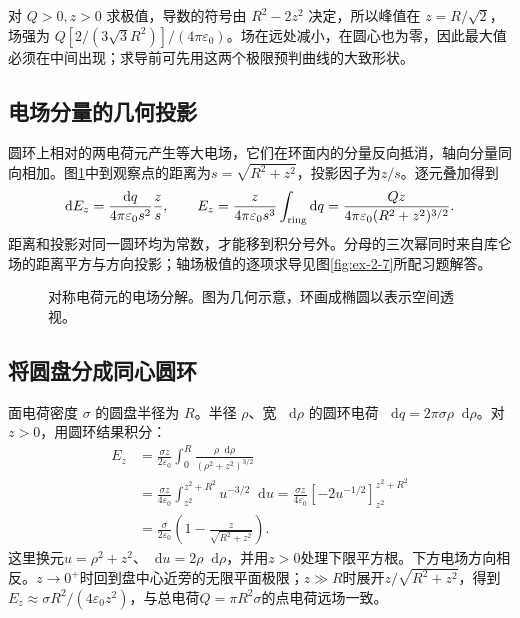\documentclass[11pt,openany,fontset=fandol]{ctexbook}
\theoremstyle{plain}\newtheorem{theorem}{定理}[chapter]\newtheorem{proposition}[theorem]{命题}
\theoremstyle{definition}\newtheorem{definition}{定义}[chapter]\newtheorem{example}{例}[chapter]
\theoremstyle{remark}\newtheorem*{remark}{说明}
\newcommand{\dd}{\mathop{}\!\mathrm d}\newcommand{\ii}{\mathrm i}\newcommand{\ee}{\mathrm e}
\begin{document}
对 $Q>0,z>0$ 求极值，导数的符号由 $R^2-2z^2$ 决定，所以峰值在 $z=R/\sqrt2$，场强为 $Q[2/(3\sqrt3R^2)]/(4\pi\varepsilon_0)$。场在远处减小，在圆心也为零，因此最大值必须在中间出现；求导前可先用这两个极限预判曲线的大致形状。

\subsection{电场分量的几何投影}
圆环上相对的两电荷元产生等大电场，它们在环面内的分量反向抵消，轴向分量同向相加。图\ref{fig:orig-033}中到观察点的距离为$s=\sqrt{R^2+z^2}$，投影因子为$z/s$。逐元叠加得到
\[
\dd E_z=\frac{\dd q}{4\pi\varepsilon_0s^2}\frac zs,
\qquad E_z=\frac{z}{4\pi\varepsilon_0s^3}\int_{\rm ring}\dd q
=\frac{Qz}{4\pi\varepsilon_0(R^2+z^2)^{3/2}}.
\]
距离和投影对同一圆环均为常数，才能移到积分号外。分母的三次幂同时来自库仑场的距离平方与方向投影；轴场极值的逐项求导见图\ref{fig:ex-2-7}所配习题解答。
\begin{figure}[H]\centering
{}
\caption{对称电荷元的电场分解。图为几何示意，环画成椭圆以表示空间透视。}
\label{fig:orig-033}
\end{figure}

\subsection{将圆盘分成同心圆环}
面电荷密度 $\sigma$ 的圆盘半径为 $R$。半径 $\rho$、宽 $\dd\rho$ 的圆环电荷 $\dd q=2\pi\sigma\rho\dd\rho$。对 $z>0$，用圆环结果积分：
\begin{align}
E_z&=\frac{\sigma z}{2\varepsilon_0}\int_0^R\frac{\rho\dd\rho}{(\rho^2+z^2)^{3/2}}\\
&=\frac{\sigma z}{4\varepsilon_0}\int_{z^2}^{z^2+R^2}u^{-3/2}\dd u
=\frac{\sigma z}{4\varepsilon_0}[-2u^{-1/2}]_{z^2}^{z^2+R^2}\\
&=\frac{\sigma}{2\varepsilon_0}\left(1-\frac z{\sqrt{R^2+z^2}}\right).
\end{align}
这里换元$u=\rho^2+z^2$、$\dd u=2\rho\dd\rho$，并用$z>0$处理下限平方根。下方电场方向相反。$z\to0^+$时回到盘中心近旁的无限平面极限；$z\gg R$时展开$z/\sqrt{R^2+z^2}$，得到$E_z\approx\sigma R^2/(4\varepsilon_0z^2)$，与总电荷$Q=\pi R^2\sigma$的点电荷远场一致。
\end{document}
